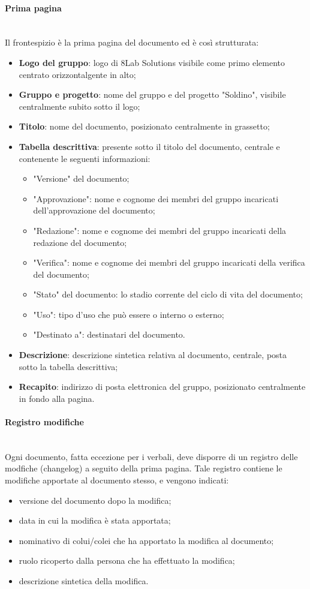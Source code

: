 		\paragraph{Prima pagina} \mbox{}\\
		Il frontespizio è la prima pagina del documento ed è così strutturata:
		\begin{itemize}
			\item \textbf{Logo del gruppo}: logo di 8Lab Solutions visibile come primo elemento centrato orizzontalgente in alto;
			\item \textbf{Gruppo e progetto}: nome del gruppo e del progetto "Soldino", visibile centralmente subito sotto il logo;
			\item \textbf{Titolo}: nome del documento, posizionato centralmente in grassetto;
			\item \textbf{Tabella descrittiva}: presente sotto il titolo del documento, centrale e contenente le seguenti informazioni:
			\begin{itemize}
				\item "Versione" del documento;
				\item "Approvazione": nome e cognome dei membri del gruppo incaricati dell'approvazione del documento;
				\item "Redazione": nome e cognome dei membri del gruppo incaricati della redazione del documento;
				\item "Verifica": nome e cognome dei membri del gruppo incaricati della verifica del documento;
				\item "Stato" del documento: lo stadio corrente del ciclo di vita del documento;
				\item "Uso": tipo d'uso che può essere o interno o esterno;
				\item "Destinato a": destinatari del documento.
			\end{itemize}
			\item \textbf{Descrizione}: descrizione sintetica relativa al documento, centrale, posta sotto la tabella descrittiva;
			\item \textbf{Recapito}: indirizzo di posta elettronica del gruppo, posizionato centralmente in fondo alla pagina.
		\end{itemize}
		\paragraph{Registro modifiche} \mbox{}\\
		Ogni documento, fatta eccezione per i verbali, deve disporre di un registro delle modfiche (changelog) a seguito della prima pagina. Tale registro contiene le modifiche apportate al documento stesso, e vengono indicati:
		\begin{itemize}
			\item versione del documento dopo la modifica;
			\item data in cui la modifica è stata apportata;
			\item nominativo di colui/colei che ha apportato la modifica al documento;
			\item ruolo ricoperto dalla persona che ha effettuato la modifica;
			\item descrizione sintetica della modifica.
		\end{itemize}
